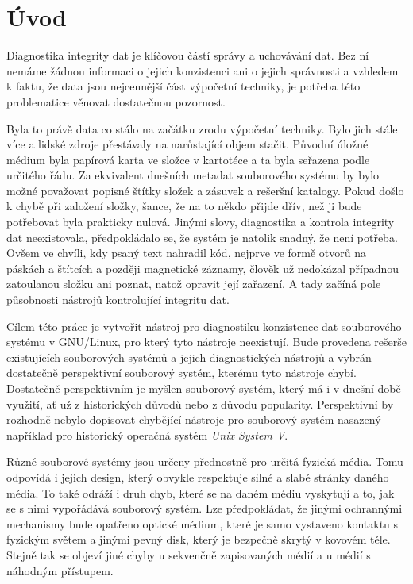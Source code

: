 \chapter*{Úvod}
{}

Diagnostika integrity dat je klíčovou částí správy a uchovávání dat. Bez ní nemáme žádnou informaci o jejich konzistenci ani o jejich správnosti a vzhledem k faktu, že data jsou nejcennější část výpočetní techniky, je potřeba této problematice věnovat dostatečnou pozornost.

Byla to právě data co stálo na začátku zrodu výpočetní techniky. Bylo jich stále více a lidské zdroje přestávaly na narůstající objem stačit. Původní úložné médium byla papírová karta ve složce v kartotéce a ta byla seřazena podle určitého řádu. Za ekvivalent dnešních metadat souborového systému by bylo možné považovat popisné štítky složek a zásuvek a rešeršní katalogy. Pokud došlo k chybě při založení složky, šance, že na to někdo přijde dřív, než ji bude potřebovat byla prakticky nulová. Jinými slovy, diagnostika a kontrola integrity dat neexistovala, předpokládalo se, že systém je natolik snadný, že není potřeba. Ovšem ve chvíli, kdy psaný text nahradil kód, nejprve ve formě otvorů na páskách a štítcích a později magnetické záznamy, člověk už nedokázal případnou zatoulanou složku ani poznat, natož opravit její zařazení. A tady začíná pole působnosti nástrojů kontrolující integritu dat.
 
Cílem této práce je vytvořit nástroj pro diagnostiku konzistence dat souborového systému v \mbox{GNU/Linux}, pro který tyto nástroje neexistují. Bude provedena rešerše existujících souborových systémů a jejich diagnostických nástrojů a vybrán dostatečně perspektivní souborový systém, kterému tyto nástroje chybí. Dostatečně perspektivním je myšlen souborový systém, který má i v dnešní době využití, ať už z historických důvodů nebo z důvodu popularity. Perspektivní by rozhodně nebylo dopisovat chybějící nástroje pro souborový systém nasazený například pro historický operačná systém \emph{Unix System V}.

Různé souborové systémy jsou určeny přednostně pro určitá fyzická média. Tomu odpovídá i jejich design, který obvykle respektuje silné a slabé stránky daného média. To také odráží i druh chyb, které se na daném médiu vyskytují a to, jak se s nimi vypořádává souborový systém. Lze předpokládat, že jinými ochrannými mechanismy bude opatřeno optické médium, které je samo vystaveno kontaktu s fyzickým světem a jinými pevný disk, který je bezpečně skrytý v kovovém těle. Stejně tak se objeví jiné chyby u sekvenčně zapisovaných médií a u médií s náhodným přístupem.

